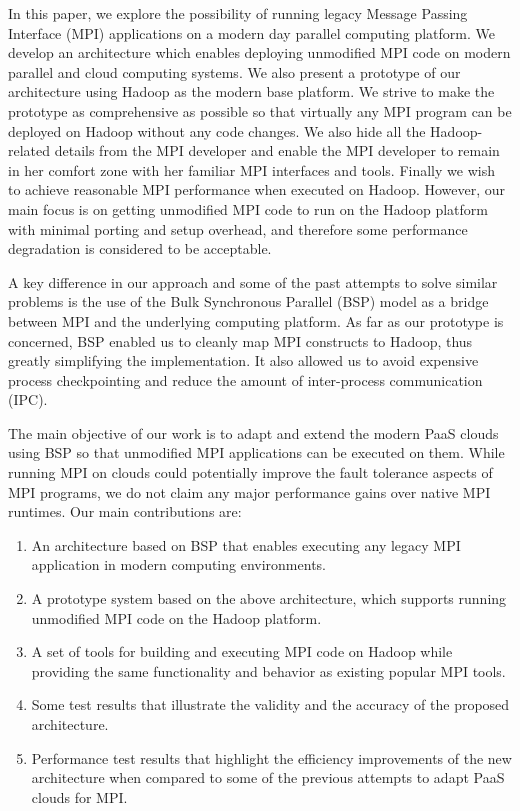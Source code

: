 \documentclass[conference,10pt] {IEEEtran}
\begin{document}
In this paper, we explore the possibility of running legacy Message Passing Interface (MPI) \cite{url:mpi} applications on a modern day parallel computing platform. We develop an architecture which enables deploying unmodified MPI code on modern parallel and cloud computing systems. We also present a prototype of our architecture using Hadoop \cite{url:hadoop} as the modern base platform. We strive to make the prototype as comprehensive as possible so that virtually any MPI program can be deployed on Hadoop without any code changes. We also hide all the Hadoop-related details from the MPI developer and enable the MPI developer to remain in her comfort zone with her familiar MPI interfaces and tools. Finally we wish to achieve reasonable MPI performance when executed on Hadoop. However, our main focus is on getting unmodified MPI code to run on the Hadoop platform with minimal porting and setup overhead, and therefore some performance degradation is considered to be acceptable.

A key difference in our approach and some of the past attempts \cite{SS12} to solve similar problems is the use of the Bulk Synchronous Parallel (BSP) model \cite{Valiant:1990:BMP:79173.79181} as a bridge between MPI and the underlying computing platform. As far as our prototype is concerned, BSP enabled us to cleanly map MPI constructs to Hadoop, thus greatly simplifying the implementation. It also allowed us to avoid expensive process checkpointing and reduce the amount of inter-process communication (IPC).

The main objective of our work is to adapt and extend the modern PaaS clouds using BSP so that unmodified MPI applications can be executed on them. While running MPI on clouds could potentially improve the fault tolerance aspects of MPI programs, we do not claim any major performance gains over native MPI runtimes. Our main contributions are:
\begin{enumerate}
\item An architecture based on BSP that enables executing any legacy MPI application in modern computing environments.
\item A prototype system based on the above architecture, which supports running unmodified MPI code on the Hadoop platform.
\item A set of tools for building and executing MPI code on Hadoop while providing the same functionality and behavior as existing popular MPI tools.
\item Some test results that illustrate the validity and the accuracy of the proposed architecture.
\item Performance test results that highlight the efficiency improvements of the new architecture when compared to some of the previous attempts to adapt PaaS clouds for MPI.
\end{enumerate}
\end{document}

